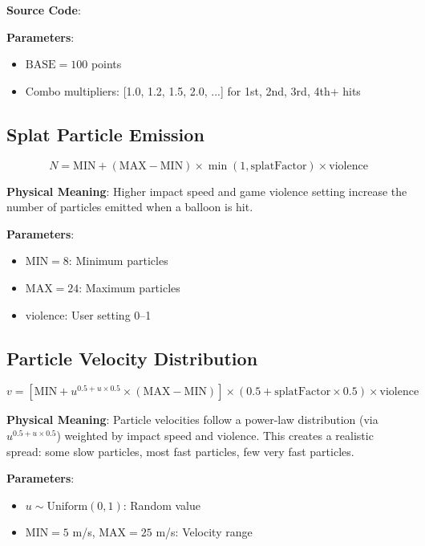 \textbf{Source Code}: 

\textbf{Parameters}:
\begin{itemize}
  \item $\mathrm{BASE} = 100$ points
  \item Combo multipliers: [1.0, 1.2, 1.5, 2.0, ...] for 1st, 2nd, 3rd, 4th+ hits
\end{itemize}

\subsection{Splat Particle Emission}

\begin{equation}
  N = \mathrm{MIN} + (\mathrm{MAX} - \mathrm{MIN}) \times \min(1, \text{splatFactor}) \times \text{violence}
  \label{eq:particle-count}
\end{equation}

\textbf{Physical Meaning}: Higher impact speed and game violence setting increase the number of particles emitted when a balloon is hit.

\textbf{Parameters}:
\begin{itemize}
  \item $\mathrm{MIN} = 8$: Minimum particles
  \item $\mathrm{MAX} = 24$: Maximum particles
  \item $\text{violence}$: User setting 0–1
\end{itemize}

\subsection{Particle Velocity Distribution}

\begin{equation}
  v = \left[\mathrm{MIN} + u^{0.5 + u \times 0.5} \times (\mathrm{MAX} - \mathrm{MIN})\right] \times (0.5 + \text{splatFactor} \times 0.5) \times \text{violence}
  \label{eq:particle-velocity}
\end{equation}

\textbf{Physical Meaning}: Particle velocities follow a power-law distribution (via $u^{0.5 + u \times 0.5}$) weighted by impact speed and violence. This creates a realistic spread: some slow particles, most fast particles, few very fast particles.

\textbf{Parameters}:
\begin{itemize}
  \item $u \sim \mathrm{Uniform}(0, 1)$: Random value
  \item $\mathrm{MIN} = 5$ m/s, $\mathrm{MAX} = 25$ m/s: Velocity range
\end{itemize}

\newpage
